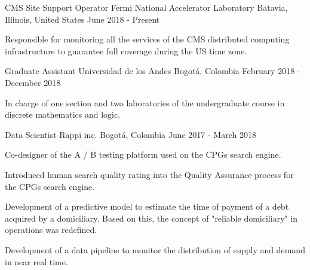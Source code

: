 


\begin{cventries}
    \cventry
    {CMS Site Support Operator}
    {Fermi National Accelerator Laboratory}
    {Batavia, Illinois, United States}
    {June 2018 - Present}
    {
        \begin{cvitems}
        \item{Responsible for monitoring all the services of the CMS distributed computing infrastructure to guarantee full coverage during the US time zone.}
        \end{cvitems}
    }

    \cventry
    {Graduate Assistant}
    {Universidad de los Andes}
    {Bogotá, Colombia}
    {February 2018 - December 2018}
    {
        \begin{cvitems}
        \item{In charge of one section and two laboratories of the undergraduate course in discrete mathematics and logic.}
        \end{cvitems}
    }

    \cventry
    {Data Scientist} %
    {Rappi inc.} %
    {Bogotá, Colombia} %
    {June 2017 - March 2018} %
    {
        \begin{cvitems}
        \item{Co-designer of the A / B testing platform used on the CPGs search engine.}
        \item{Introduced human search quality rating into the Quality Assurance process for the CPGs search engine.}
        \item{Development of a predictive model to estimate the time of payment of a debt acquired by a domiciliary. Based on this, the concept of "reliable domiciliary" in operations was redefined.}
        \item{Development of a data pipeline to monitor the distribution of supply and demand in near real time.}
        \end{cvitems}
    } %



\end{cventries}
